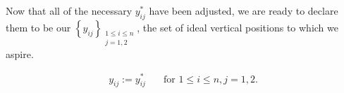 \documentclass[12pt,twoside]{extarticle}
\begin{document}
{\begin{minipage}[t][]{0.42\textwidth}
Now that all of the necessary $y_{ij}^*$ have been adjusted, we are ready to declare them to be our $\left \{ y_{ij} \right \}_{\substack{1 \leq i \leq n \\ j=1,2}}$, the set of ideal vertical positions to which we aspire.

\begin{align*}
y_{ij} := y_{ij}^* \quad &\text{for }1 \leq i \leq n, j = 1,2.
\end{align*}

\end{minipage}}%
\hspace{1.2cm} 
\end{document}
